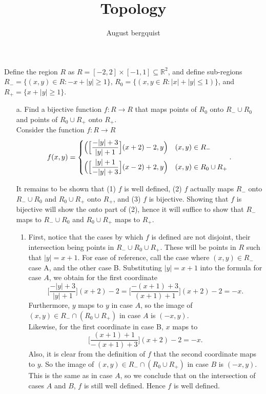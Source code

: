 \documentclass{article}
\title{Topology}
\author{August bergquist}
\newcommand{\R}{\mathbb{R}}
\newcommand{\R}{\mathbb{R}}
\begin{document}
\maketitlea

 Define the region $R$ as $R = [-2,2]\times [-1,1]\subseteq \R^2$, and define sub-regions $R_- = \{(x,y)\in R : -x + |y| \ge 1 \}$, $R_0 = \{(x,y\in R : |x| + |y| \le 1)\}$, and $R_+ = \{x + |y| \ge 1\}$.\\

\begin{itemize}
    \item[a. ] Find a bijective function $f:R\rightarrow R$ that maps points of $R_0$ onto $R_- \cup R_0$ and points of $R_0\cup R_+$ onto $R_+$. \\
    
     Consider the function  $f:R\rightarrow R$
    $$f(x,y) = 
    \begin{dcases}
    \Big( \Big[\frac{-|y|+3}{|y|+1}\Big](x+2)-2 ,y\Big) & (x,y)\in R_- \\
    \Big( \Big[\frac{|y| + 1}{-|y|+3}\Big](x-2)+2 ,y\Big) & (x,y)\in R_0 \cup R_+ 
    \end{dcases}.
    $$
    
    It remains to be shown that (1) $f$ is well defined, (2) $f$ actually maps $R_-$ onto $R_- \cup R_0$ and $R_0\cup R_+$ onto $R_+$, and (3) $f$ is bijective. Showing that $f$ is bijective will show the onto part of (2), hence it will suffice to show that $R_-$ maps to $R_-\cup R_0$ and $R_0\cup R_+$ maps to $R_+$.\\
    
    \begin{enumerate}
        \item First, notice that the cases by which $f$ is defined are not disjoint, their intersection being points in $R_- \cup R_0\cup R_+$. These will be points in $R$ such that $|y| = x + 1$. For ease of reference, call the case where $(x,y)\in R_-$ case A, and the other case B. Substituting $|y| = x + 1$ into the formula for case $A$, we obtain for the first coordinate
        $$\Big[\frac{-|y|+3}{|y|+1}\Big](x+2)-2 = \Big[\frac{-(x+1)+3}{(x+1)+1}\Big](x+2)-2 = -x.$$
        Furthermore, $y$ maps to $y$ in case $A$, so the image of $(x,y)\in R_-\cap (R_0\cup R_+)$ in case $A$ is $(-x,y)$.\\
        
        Likewise, for the first coordinate in case B, $x$ maps to 
        $$ \Big[\frac{(x+1) + 1}{-(x+1)+3}\Big](x+2)-2 = -x.$$
        Also, it is clear from the definition of $f$ that the second coordinate maps to $y$. So the image of $(x,y)\in R_-\cap (R_0\cup R_+)$ in case $B$ is $(-x,y)$. This is the same as in case $A$, so we conclude that on the intersection of cases $A$ and $B$, $f$ is still well defined. Hence $f$ is well defined. \\
        

\end{enumerate}
\end{itemize}
\end{document}
